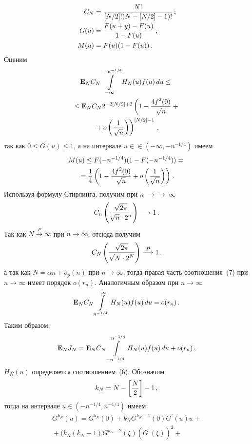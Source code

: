 \begin{multicols}{2}
\noindent
\begin{align*}
C_N&=\displaystyle\frac{\displaystyle N!\mathstrut}{\displaystyle [N/2]!(N-[N/2]-1)!\mathstrut}\,; \\
 G(u)&=\displaystyle\frac{\displaystyle F(u+y)-F(u)\mathstrut}{\displaystyle 1-F(u)\mathstrut}\,; \\
M(u)&=F(u)(1-F(u))\,.
\end{align*}
 Оценим
\begin{multline}
{\bf E}_NC_N\int\limits_{-\infty}^{-n^{-1/4}}H_N(u)f(u)\,du \leq {}\\
{}\leq {\bf E}_NC_N
 2^{-2\left[N/2\right]+2}\left(1-\displaystyle\frac{\displaystyle 4f^2(0)\mathstrut}{\displaystyle \sqrt{n}\mathstrut}+{}\right.\\
\left.{} +o\left(\displaystyle\frac{\displaystyle 1\mathstrut}{\displaystyle \sqrt{n}\mathstrut}\right)\right)^{\left[N/2\right]-1}\,,
 \label{7}
\end{multline}
так как $0\leq G(u) \leq 1$, а на интервале  
$ u\in$\linebreak $\in (-\infty, -n^{-1/4})$ имеем
\begin{multline*}
M(u)\leq
F(-n^{-1/4})(1-F(-n^{-1/4}))={}\\
{}=
\displaystyle\frac{\displaystyle 1\mathstrut}{\displaystyle 4\mathstrut}\left(1-\displaystyle\frac{\displaystyle 4f^2(0)\mathstrut}{\displaystyle \sqrt{n}\mathstrut}+o\left(\displaystyle\frac{\displaystyle 1\mathstrut}{\displaystyle \sqrt{n}\mathstrut}
\right)\right)\,.
\end{multline*}
Используя формулу Стирлинга, получим при $n\;\to$\linebreak $\to\;\infty$
\begin{equation}
C_n \left(\displaystyle\frac{\displaystyle \sqrt{2\pi}\mathstrut}{\displaystyle \sqrt{n}\cdot 2^n\mathstrut}\right)\longrightarrow 1\,.
\label{8}
\end{equation}
Так как $ N \stackrel{P}{\longrightarrow}\infty$ при
$n \to \infty$, отсюда получим
$$
C_N\left(\displaystyle\frac{\displaystyle \sqrt{2\pi}\mathstrut}{\displaystyle \sqrt{N}\cdot 2^N\mathstrut}\right)\stackrel{P}{\longrightarrow}1\,,
$$
а так  как  $N=\alpha n+o_p(n)$ при  $n \to \infty$, тогда правая
часть соотношения~(7) при $n \to \infty$ имеет порядок $o(r_n)$.
Аналогичным образом при $n \to \infty$
$$
{\bf E}_NC_N\int\limits_{n^{-1/4}}^{\infty}H_N(u)f(u)\,du=o(r_n)\,.
$$
Таким  образом,
\begin{equation}
{\bf E}_NJ_N={\bf E}_NC_N\int\limits_{-n^{-1/4}}^{n^{-1/4}}H_N(u)f(u)\,du+o(r_n)\,,
\label{9}
\end{equation}
$H_N(u)$ определяется соотношением~(6). Обозначим
\begin{equation}
k_{N}=N-\left[\displaystyle\frac{\displaystyle N\mathstrut}{\displaystyle 2\mathstrut}\right]-1\,, \label{10}
\end{equation}  
тогда на
интервале $u\in (-n^{-1/4},n^{-1/4}) $ имеем
\begin{multline}
G^{k_{N}}(u)=G^{k_{N}}(0)+k_{N}G^{k_{N}-1}(0)G^{\prime}(u)u+{}\\
{}+(k_{N}(k_{N}-1)G^{k_{N}-2}(\xi) (G^{\prime}(\xi))^2+{}\\

\end{multline}
\end{multicols}
